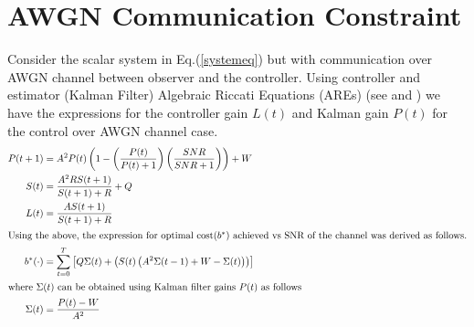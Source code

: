 \documentclass[12pt]{caltech_thesis_finalreport}
\begin{document}
\chapter{AWGN Communication Constraint}
Consider the scalar system in Eq.(\ref{systemeq}) but with communication over AWGN channel between observer and the controller. Using controller and estimator (Kalman Filter) Algebraic Riccati Equations (AREs) (see \cite{anatoly} and \cite{lqg}) we have the expressions for the controller gain $L(t)$ and Kalman gain $P(t)$ for the control over AWGN channel case.
\begin{align}
P(t+1) &= A^{2}P(t)\left(1 - \left(\frac{P(t)}{P(t) + 1}\right)\left(\frac{SNR}{SNR + 1}\right)\right) + W\\
S(t) &= \frac{A^{2}RS(t+1)}{S(t+1) + R} + Q\\
L(t) &= \frac{AS(t+1)}{S(t+1) + R}\\
\intertext{Using the above, the expression for optimal cost($b^{*}$) achieved vs SNR of the channel was derived as follows.}
	\label{computedJ}
	 b^{*}(\cdot) &= \sum\limits_{t = 0}^{T} \left[Q\Sigma(t) + \left(S(t)\left(A^{2}\Sigma(t-1) + W - \Sigma(t)\right)\right)\right]\\
	 \intertext{where $\Sigma(t)$ can be obtained using Kalman filter gains $P(t)$ as follows}
	 \Sigma(t) &= \frac{P(t)-W}{A^{2}}
	\end{align}
%					  
\end{document}
